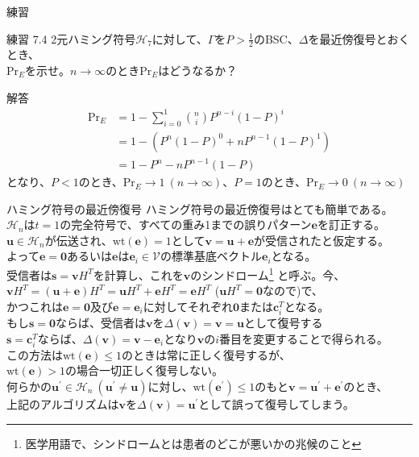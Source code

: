 \documentclass[dvipdfmx,10pt,jsarticle]{beamer}
\newcommand{\code}[1]{\mathcal{#1}}
\newcommand{\vs}[1]{\mathcal{#1}}
\renewcommand{\vec}[1]{\mathbf{#1}}
\begin{document}
  \begin{frame}{練習}
    \begin{block}{練習 7.4}
      2元ハミング符号$\code{H}_7$に対して、$\Gamma$を$P > \frac 12$のBSC、$\Delta$を最近傍復号とおくとき、 \\
      $\text{Pr}_E$を示せ。$n \rightarrow \infty$のとき$\text{Pr}_E$はどうなるか？
    \end{block}
    \begin{block}{解答}
      \begin{align*}
        \text{Pr}_E &= 1 - \sum_{i=0}^{1} \binom ni P^{n-i} {(1-P)}^i  \\
        &= 1 - (P^{n} {(1-P)}^0 + n P^{n-1} {(1-P)}^1) \\
        &= 1 - P^n - nP^{n-1}(1 - P)
      \end{align*}
      となり、$P < 1$のとき、$\text{Pr}_E \rightarrow 1 \ (n \rightarrow \infty)$、$P = 1$のとき、$\text{Pr}_E \rightarrow 0 \ (n \rightarrow \infty) $
    \end{block}
  \end{frame}
  \begin{frame}{ハミング符号の最近傍復号}
    ハミング符号の最近傍復号はとても簡単である。 \\
    \vspace{1em}
    $\code{H}_n$は$t=1$の完全符号で、すべての重み1までの誤りパターン$\vec{e}$を訂正する。\\
    $\vec{u} \in \code{H}_n$が伝送され、$\text{wt}(\vec{e}) = 1$として$\vec{v} = \vec{u} + \vec{e}$が受信されたと仮定する。 \\
    よって$\vec{e} =\vec{0}$あるいは$\vec{e}$は$\vec{e}_i \in \vs{V}$の標準基底ベクトル$\vec{e}_i$となる。 \\
    \vspace{1em}
    受信者は$\vec{s} = \vec{v} H^T$を計算し、これを$\vec{v}$のシンドローム\footnote{{\scriptsize 医学用語で、シンドロームとは患者のどこが悪いかの兆候のこと}}
    と呼ぶ。今、$\vec{v}H^T = (\vec{u} + \vec{e}) H^T = \vec{u}H^T + \vec{e}H^T = \vec{e}H^T$ ($\vec{u}H^T = \vec{0}$なので)で、\\
    かつこれは$\vec{e} = \vec{0}$及び$\vec{e} = \vec{e}_i$に対してそれぞれ$\vec{0}$または$\vec{c}^T_i$となる。\\
    \vspace{1em}
    もし$\vec{s} = \vec{0}$ならば、受信者は$\vec{v}$を$\Delta (\vec{v}) = \vec{v} = \vec{u}$として復号する \\
    $\vec{s}= \vec{c}^T_i$ならば、$\Delta(\vec{v}) = \vec{v} - \vec{e}_i$となり$\vec{v}$の$i$番目を変更することで得られる。 \\
    この方法は$\text{wt}(\vec{e}) \leq 1$のときは常に正しく復号するが、\\
    $\text{wt}(\vec{e}) >1$の場合一切正しく復号しない。\\
    何らかの$\vec{u}^\prime \in \code{H}_n \ (\vec{u}^\prime \neq \vec{u})$に対し、$\text{wt}(\vec{e}^\prime) \leq 1$のもと$\vec{v} = \vec{u}^\prime + \vec{e}^\prime$のとき、 \\
    上記のアルゴリズムは$\vec{v}$を$\Delta (\vec{v}) = \vec{u}^\prime$として誤って復号してしまう。

  \end{frame}
\end{document}
